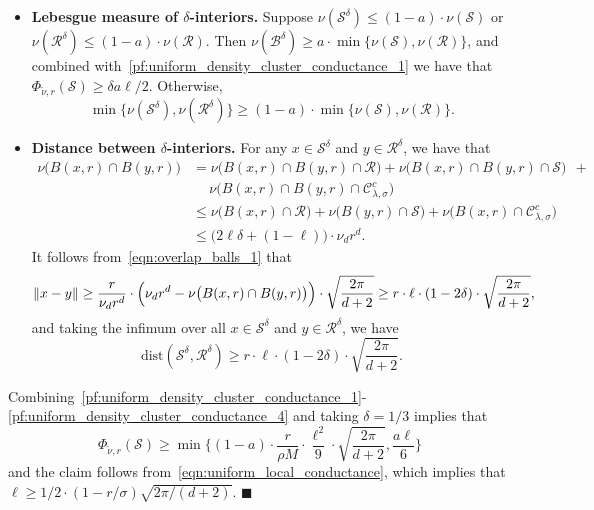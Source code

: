 \documentclass[twoside,11pt]{article}
\newcommand{\1}{\mathbf{1}}
\newcommand{\mc}[1]{\mathcal{#1}}
\newcommand{\wt}[1]{\widetilde{#1}}
\newcommand{\qed}{\hfill $\blacksquare$}
\begin{document}
\begin{itemize}
\begin{equation}
	\end{equation}
	\item \textbf{Lebesgue measure of $\delta$-interiors.} Suppose $\nu(\mc{S}^{\delta}) \leq (1 - a) \cdot \nu(\mc{S})$ or $\nu(\mc{R}^{\delta}) \leq (1 - a) \cdot \nu(\mc{R})$. Then 
	$\nu(\mc{B}^{\delta}) \geq a \cdot \min\{\nu(\mc{S}), \nu(\mc{R})\}$, and combined with~\eqref{pf:uniform_density_cluster_conductance_1} we have that $\Phi_{\wt{\nu},r}(\mc{S}) \geq \delta a \ell/2$. Otherwise,
	\begin{equation}
	\label{pf:uniform_density_cluster_conductance_3}
	\min\bigl\{\nu(\mc{S}^{\delta}),\nu(\mc{R}^{\delta})\bigr\} \geq (1- a) \cdot \min\bigl\{\nu(\mc{S}),\nu(\mc{R})\bigr\}.
	\end{equation}
	\item \textbf{Distance between $\delta$-interiors.} For any $x \in \mc{S}^{\delta}$ and $y \in \mc{R}^{\delta}$, we have that 
	\begin{align*}
	\nu\bigl(B(x,r) \cap B(y,r)\bigr) & = \nu\bigl(B(x,r) \cap B(y,r) \cap \mc{R}\bigr) + \nu\bigl(B(x,r) \cap B(y,r) \cap \mc{S}\bigr) ~~+ \\
	& \quad~\nu\bigl(B(x,r) \cap B(y,r) \cap \mc{C}_{\lambda,\sigma}^c\bigr) \\
	& \leq \nu\bigl(B(x,r) \cap \mc{R}\bigr) + \nu\bigl(B(y,r) \cap \mc{S}\bigr) + \nu\bigl(B(x,r) \cap \mc{C}_{\lambda,\sigma}^c\bigr) \\
	& \leq \bigl(2\ell\delta + (1 - \ell)\bigr) \cdot \nu_dr^d.
	\end{align*}
	It follows from~\eqref{eqn:overlap_balls_1} that
	\begin{equation*}
	\|x - y\| \geq \frac{r}{\nu_d r^d} \cdot \Bigl(\nu_d r^d - \nu\bigl(B(x,r) \cap B(y,r)\bigr)\Bigr) \cdot \sqrt{\frac{2\pi}{d + 2}} \geq r \cdot \ell \cdot (1 - 2\delta) \cdot \sqrt{\frac{2\pi}{d + 2}},
	\end{equation*}
	and taking the infimum over all $x \in \mc{S}^{\delta}$ and $y \in \mc{R}^{\delta}$, we have
	\begin{equation}
	\label{pf:uniform_density_cluster_conductance_4}
	\mathrm{dist}(\mc{S}^{\delta},\mc{R}^{\delta}) \geq r \cdot \ell \cdot (1 - 2\delta) \cdot \sqrt{\frac{2\pi}{d + 2}}.
	\end{equation}
\end{itemize}	
Combining~\eqref{pf:uniform_density_cluster_conductance_1}-\eqref{pf:uniform_density_cluster_conductance_4} and taking $\delta = 1/3$ implies that
\begin{equation*}
\Phi_{\wt{\nu},r}(\mc{S}) \geq \min\biggl\{(1 - a) \cdot \frac{r}{\rho M} \cdot \frac{\ell^2}{9} \cdot \sqrt{\frac{2\pi}{d + 2}}, \frac{a\ell}{6}\biggr\}
\end{equation*}
and the claim follows from~\eqref{eqn:uniform_local_conductance}, which implies that $\ell \geq 1/2 \cdot (1 - r/\sigma)\sqrt{2\pi/(d + 2)}$. \qed
\end{document}
